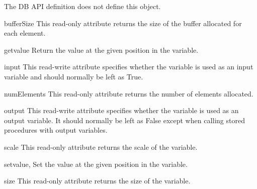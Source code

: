 \documentclass{manual}
\begin{document}
 The DB API definition does not define this object.

\begin{datadesc}{bufferSize}
  This read-only attribute returns the size of the buffer allocated for each
  element.
\end{datadesc}

\begin{funcdesc}{getvalue}{}
  Return the value at the given position in the variable.
\end{funcdesc}

\begin{datadesc}{input}
  This read-write attribute specifies whether the variable is used as an input
  variable and should normally be left as True.
\end{datadesc}

\begin{datadesc}{numElements}
  This read-only attribute returns the number of elements allocated.
\end{datadesc}

\begin{datadesc}{output}
  This read-write attribute specifies whether the variable is used as an output
  variable. It should normally be left as False except when calling stored
  procedures with output variables.
\end{datadesc}

\begin{datadesc}{scale}
  This read-only attribute returns the scale of the variable.
\end{datadesc}

\begin{funcdesc}{setvalue}{, }
  Set the value at the given position in the variable.
\end{funcdesc}

\begin{datadesc}{size}
  This read-only attribute returns the size of the variable.
\end{datadesc}


\end{document}
